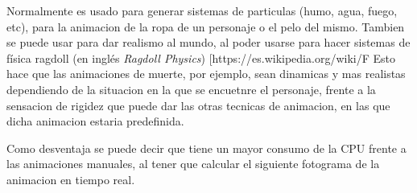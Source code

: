 \documentclass{article}
\begin{document}
\bigskip

Normalmente es usado para generar sistemas de particulas (humo, agua, fuego, etc), para la animacion de la ropa de un personaje o el pelo del mismo. Tambien se puede usar para dar realismo al mundo, al poder usarse para hacer sistemas de física ragdoll (en inglés \textit{Ragdoll Physics}) [https://es.wikipedia.org/wiki/F%
Esto hace que las animaciones de muerte, por ejemplo, sean dinamicas y mas realistas dependiendo de la situacion en la que se encuetnre el personaje, frente a la sensacion de rigidez que puede dar las otras tecnicas de animacion, en las que dicha animacion estaria predefinida.

\bigskip

Como desventaja se puede decir que tiene un mayor consumo de la CPU frente a las animaciones manuales, al tener que calcular el siguiente fotograma de la animacion en tiempo real.
\end{document}
